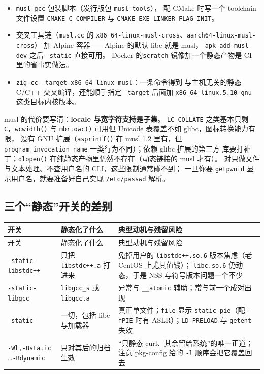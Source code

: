 \documentclass[12pt,a4paper,fontset=fandol]{ctexbook}
\newcommand{\Fn}[1]{\texttt{#1()}}
\newcommand{\Tp}[1]{\texttt{#1}}
\newcommand{\Bk}{\allowbreak}
\begin{document}
\begin{itemize}
\item \Tp{musl-gcc} 包装脚本（发行版包 \Tp{musl-tools}），
      配 CMake 时写一个 toolchain 文件设置
      \Tp{CMAKE\_C\_COMPILER} 与 \Tp{CMAKE\_EXE\_LINKER\_FLAG\_INIT}。
\item 交叉工具链（\Tp{musl.cc} 的
      \Tp{x86\Bk\_64\Bk-linux\Bk-musl\Bk-cross}、\Tp{aarch64\Bk-linux\Bk-musl\Bk-cross}）
      加 Alpine 容器——Alpine 的默认 libc 就是 musl，
      \lstinline|apk add musl-dev| 之后 \Tp{-static} 直接可用。
      Docker 的\lstinline|scratch| 镜像加一个静态产物是 CI 里的省事实做法。
\item \lstinline|zig cc -target x86_64-linux-musl|：一条命令得到
      与主机无关的静态 C/C++ 交叉编译，还能顺手指定
      \Tp{-target} 后面加 \Tp{x86\_64-linux.5.10-gnu}
      这类目标内核版本。
\end{itemize}

musl 的代价要写清：\textbf{locale 与宽字符支持是子集}。
\Tp{LC\_COLLATE} 之类基本只剩 \Tp{C}，\Fn{wcwidth} 与
\Fn{mbrtowc} 可用但 Unicode 表覆盖不如 glibc，图标转换能力有限，
没有 GNU 扩展（\Fn{asprintf} 在 musl 1.2 里有，但
\Tp{program\_invocation\_name} 一类行为不同）；依赖 glibc 扩展的第三方
库要打补丁；\Fn{dlopen} 在纯静态产物里仍然不存在（动态链接的 musl 才有）。
对只做文件与文本处理、不查用户名的 CLI，这些限制通常碰不到；
一旦你要 \Tp{getpwuid} 显示用户名，就要准备好自己实现 \Tp{/etc/passwd} 解析。

\subsection{三个``静态''开关的差别}

\begin{longtable}{@{}>{\raggedright\arraybackslash}p{}
                 >{\raggedright\arraybackslash}p{}
                 >{\raggedright\arraybackslash}p{}@{}}
\toprule
开关 & 静态化了什么 & 典型动机与残留风险 \\
\midrule
\endfirsthead
\toprule
开关 & 静态化了什么 & 典型动机与残留风险 \\
\midrule
\endhead
\Tp{-static-libstdc++} & 只把 \Tp{libstdc++.a} 打进来 &
免掉用户的 \Tp{libstdc++.so.6} 版本焦虑（老 CentOS 上尤其值钱）；
\Tp{libc.so.6} 仍动态，于是 NSS 与符号版本问题一个不少 \\
\Tp{-static-libgcc} & \Tp{libgcc\Bk\_s} 或 \Tp{libgcc.a} &
异常与 \Tp{\_\_atomic} 辅助；常与前一个成对出现 \\
\Tp{-static} & 一切，包括 libc 与加载器 &
真正单文件；\Tp{file} 显示 \Tp{static-pie}（配
\Tp{-fPIE} 时有 ASLR）；\Tp{LD\_PRELOAD} 与 \Tp{getent} 失效 \\
\Tp{-Wl,-Bstatic} \dots \Tp{-Bdynamic} & 只对其后的归档生效 &
``只静态 curl、其余留给系统''的唯一正道；注意 pkg-config 给的
\Tp{-l} 顺序会把它覆盖回去 \\
\bottomrule
\end{longtable}
\end{document}
